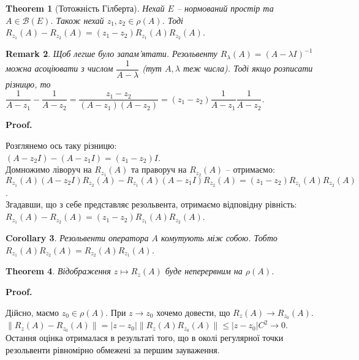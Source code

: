 \documentclass[a4paper, 10pt]{article}
\makeatletter
\theoremstyle{theoremdd}
\newtheorem{theorem}{Theorem}[subsection]
\theoremstyle{theoremdd}
\theoremstyle{theoremdd}
\theoremstyle{theoremdd}
\theoremstyle{theoremdd}
\theoremstyle{theoremdd}
\newtheorem{remark}[theorem]{Remark}
\theoremstyle{theoremdd}
\theoremstyle{theoremdd}
\newtheorem{corollary}[theorem]{Corollary}
\renewenvironment{proof}[1][Proof.\\]{\par
\pushQED{\hfill \qed}%
\normalfont \topsep6\p@\@plus6\p@\relax
\trivlist
\item\relax
{\bfseries
#1\@addpunct{.}}\hspace\labelsep\ignorespaces
}{%
\popQED\endtrivlist\@endpefalse
}
\makeatother
\begin{document}
\begin{theorem}[Тотожність Гілберта]
Нехай $E$ -- нормований простір та $A \in \mathcal{B}(E)$. Також нехай $z_1,z_2 \in \rho(A)$. Тоді \\ $R_{z_1}(A) - R_{z_2}(A) = (z_1-z_2) R_{z_1}(A) R_{z_2}(A)$.
\end{theorem}

\begin{remark}
Щоб легше було запам'ятати. Резольвенту $R_{\lambda}(A) = (A-\lambda I)^{-1}$ можна асоціювати з числом $\dfrac{1}{A-\lambda}$ (тут $A,\lambda$ теж числа). Тоді якщо розписати різницю, то\\
$\dfrac{1}{A - z_1} - \dfrac{1}{A - z_2} = \dfrac{z_1-z_2}{(A-z_1)(A-z_2)} = (z_1-z_2) \dfrac{1}{A-z_1} \dfrac{1}{A-z_2}$.
\end{remark}

\begin{proof}
Розглянемо ось таку різницю:\\
$(A - z_2 I) - (A - z_1I) = (z_1 - z_2)I$.\\
Домножимо ліворуч на $R_{z_1}(A)$ та праворуч на $R_{z_2}(A)$ -- отримаємо:\\
$R_{z_1}(A) (A- z_2I) R_{z_2}(A) - R_{z_1}(A) (A - z_1I) R_{z_2}(A) = (z_1-z_2) R_{z_1}(A) R_{z_2}(A)$.\\
Згадавши, що з себе представляє резольвента, отримаємо відповідну рівність:\\
$R_{z_1}(A) - R_{z_2}(A) = (z_1-z_2) R_{z_1}(A) R_{z_2}(A)$.
\end{proof}

\begin{corollary}
Резольвенти оператора $A$ комутують між собою. Тобто $R_{z_1}(A) R_{z_2}(A) = R_{z_2}(A) R_{z_1}(A)$.
\end{corollary}

\begin{theorem}
Відображення $z \mapsto R_z(A)$ буде неперервним на $\rho(A)$.
\end{theorem}

\begin{proof}
Дійсно, маємо $z_0 \in \rho(A)$. При $z \to z_0$ хочемо довести, що $R_{z}(A) \to R_{z_0}(A)$.\\
$\| R_z(A) - R_{z_0}(A) \| = |z - z_0| \| R_z(A) R_{z_0}(A) \| \leq |z-z_0| C^2 \to 0$.\\
Остання оцінка отрималася в результаті того, що в околі регулярної точки резольвенти рівномірно обмежені за першим зауваження.
\end{proof}
\end{document}
